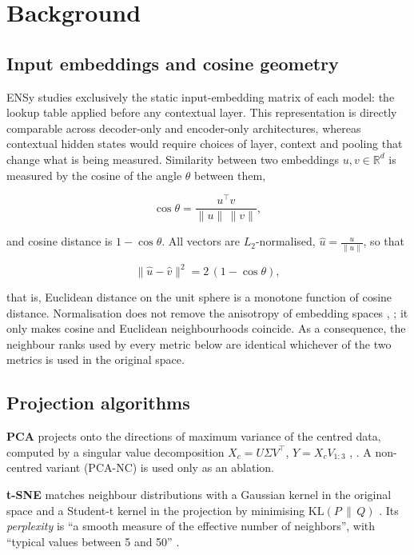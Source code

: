 \documentclass[conference,a4paper]{IEEEtran}
\begin{document}
\section{Background}\label{sec:background}

\subsection{Input embeddings and cosine geometry}\label{sec:input-embeddings-cosine}

ENSy studies exclusively the static input-embedding matrix of each
model: the lookup table applied before any contextual layer. This
representation is directly comparable across decoder-only and
encoder-only architectures, whereas contextual hidden states would
require choices of layer, context and pooling that change what is being
measured. Similarity between two embeddings \(u, v \in \mathbb{R}^d\) is
measured by the cosine of the angle \(\theta\) between them,

\begin{equation}
\cos\theta = \frac{u^\top v}{\|u\|\,\|v\|},
\end{equation}

and cosine distance is \(1 - \cos\theta\). All vectors are
\(L_2\)-normalised, \(\hat u = \frac{u}{\|u\|}\), so that

\begin{equation}
\|\hat u - \hat v\|^2 = 2\,(1 - \cos\theta),
\end{equation}

that is, Euclidean distance on the unit sphere is a monotone function of
cosine distance. Normalisation does not remove the anisotropy of
embedding spaces \cite{r4}, \cite{r5}; it only makes cosine and
Euclidean neighbourhoods coincide. As a consequence, the neighbour ranks
used by every metric below are identical whichever of the two metrics is
used in the original space.

\subsection{Projection algorithms}\label{sec:projection-algorithms}

\textbf{PCA} projects onto the directions of maximum variance of the
centred data, computed by a singular value decomposition
\(X_c = U\Sigma V^\top\), \(Y = X_c V_{1:3}\) \cite{r6}, \cite{r7}. A
non-centred variant (PCA-NC) is used only as an ablation.

\textbf{t-SNE} matches neighbour distributions with a Gaussian kernel in
the original space and a Student-t kernel in the projection by
minimising \(\mathrm{KL}(P\,\|\,Q)\) \cite{r8}. Its \emph{perplexity} is
``a smooth measure of the effective number of neighbors'', with
``typical values between 5 and 50'' \cite[p. 2582]{r8}.
\end{document}
